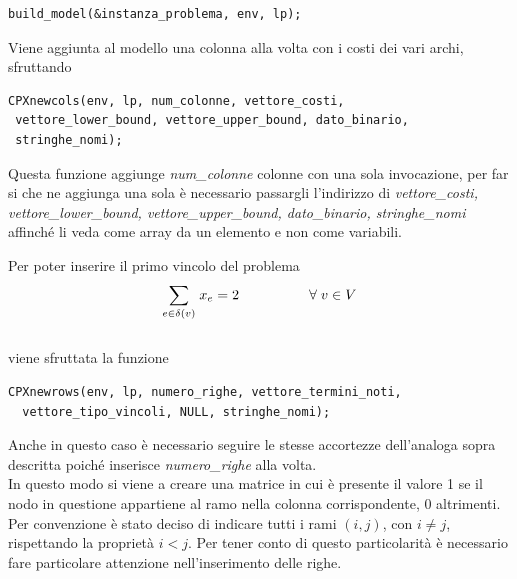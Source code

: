 \begin{lstlisting}[linewidth=250pt, basicstyle=\footnotesize\sffamily,]     
build_model(&instanza_problema, env, lp);
\end{lstlisting}

Viene aggiunta al modello una colonna alla volta con i costi dei vari archi, sfruttando \\

\begin{lstlisting}[linewidth=350pt, basicstyle=\footnotesize\sffamily,]     
CPXnewcols(env, lp, num_colonne, vettore_costi,
 vettore_lower_bound, vettore_upper_bound, dato_binario, 
 stringhe_nomi);
\end{lstlisting}

Questa funzione aggiunge \textit{num\_colonne} colonne con una sola invocazione, per far si che ne aggiunga una sola è necessario passargli l'indirizzo di \textit{vettore\_costi, vettore\_lower\_bound, vettore\_upper\_bound, dato\_binario, stringhe\_nomi} affinché li veda come array da un elemento e non come variabili.

Per poter inserire il primo vincolo del problema\\

$$
\underset{e\in \delta(v)}\sum{\;x_e} = 2\;\;\;\;\;\;\;\;\;\;\;\;\;\;\;\;\;\;\forall\;v\in V \\\\
$$
\\
viene sfruttata la funzione \\

\begin{lstlisting}[linewidth=350pt, basicstyle=\footnotesize\sffamily,]     
 CPXnewrows(env, lp, numero_righe, vettore_termini_noti,
  vettore_tipo_vincoli, NULL, stringhe_nomi);
\end{lstlisting}

Anche in questo caso è necessario seguire le stesse accortezze dell'analoga sopra descritta poiché inserisce \textit{numero\_righe} alla volta.\\
In questo modo si viene a creare una matrice in cui è presente il valore 1 se il nodo in questione appartiene al ramo nella colonna corrispondente, 0 altrimenti.\\
Per convenzione è stato deciso di indicare tutti i rami $(i,j)$, con $i\neq j$, rispettando la proprietà $i<j$. Per tener conto di questo particolarità è necessario fare particolare attenzione nell'inserimento delle righe.\\


